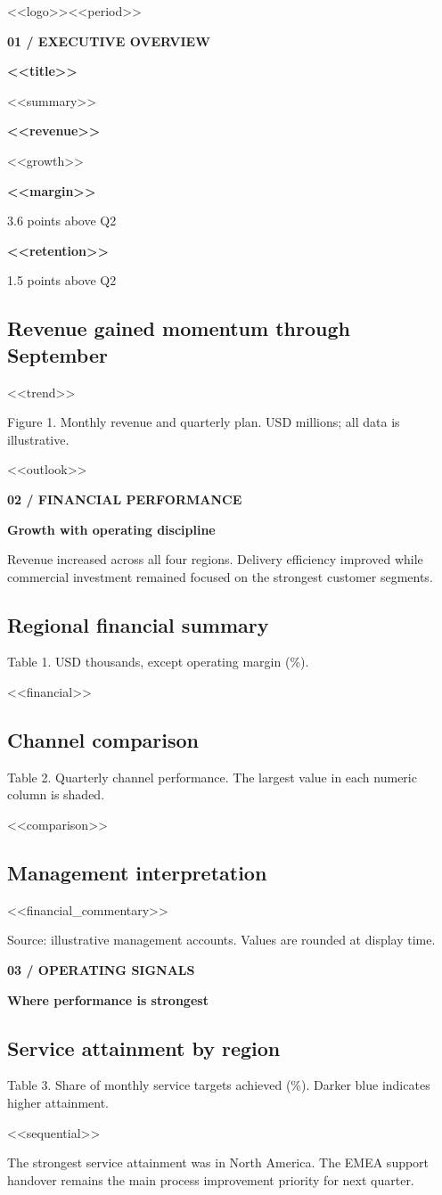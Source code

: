 \documentclass[10pt]{article}
\newcommand{\eyebrow}[1]{{\small\bfseries\color{teal}#1}\par}
\newcommand{\pagetitle}[2]{\eyebrow{#1}{\fontsize{25}{30}\selectfont\bfseries #2}\par\vspace{7pt}}
\newcommand{\note}[1]{\par{\footnotesize\color{muted}#1}\par}
\newcommand{\kpi}[3]{\colorbox{paper}{\begin{minipage}[t]{0.285\linewidth}\vspace{7pt}{\small #1}\par{\Large\bfseries #2}\par{\footnotesize\color{teal}#3}\vspace{7pt}\end{minipage}}}
\begin{document}
\thispagestyle{fancy}
<<logo>>\hfill {\small\color{muted}<<period>>}\par
\vspace{18pt}
\pagetitle{01 / EXECUTIVE OVERVIEW}{<<title>>}
<<summary>>\par
\vspace{6pt}
\kpi{Quarterly revenue}{<<revenue>>}{<<growth>>}\hfill
\kpi{Operating margin}{<<margin>>}{3.6 points above Q2}\hfill
\kpi{Customer retention}{<<retention>>}{1.5 points above Q2}\par
\vspace{15pt}
\subsection*{Revenue gained momentum through September}
\begin{center}<<trend>>\end{center}
\note{Figure 1. Monthly revenue and quarterly plan. USD millions; all data is illustrative.}
<<outlook>>

\newpage
\pagetitle{02 / FINANCIAL PERFORMANCE}{Growth with operating discipline}
Revenue increased across all four regions. Delivery efficiency improved while
commercial investment remained focused on the strongest customer segments.
\subsection*{Regional financial summary}
\note{Table 1. USD thousands, except operating margin (\%).}
\begin{center}\small <<financial>>\end{center}
\subsection*{Channel comparison}
\note{Table 2. Quarterly channel performance. The largest value in each numeric column is shaded.}
\begin{center}\small <<comparison>>\end{center}
\subsection*{Management interpretation}
<<financial_commentary>>
\note{Source: illustrative management accounts. Values are rounded at display time.}

\newpage
\pagetitle{03 / OPERATING SIGNALS}{Where performance is strongest}
\subsection*{Service attainment by region}
\note{Table 3. Share of monthly service targets achieved (\%). Darker blue indicates higher attainment.}
\begin{center}\small <<sequential>>\end{center}
The strongest service attainment was in North America. The EMEA support
handover remains the main process improvement priority for next quarter.
\end{document}

